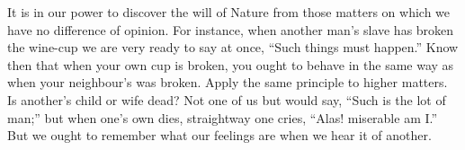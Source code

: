 It is in our  power to discover the will of Nature from  those matters on which
we have  no difference of opinion.  For instance, when another  man's slave has
broken  the wine-cup  we are  very ready  to say  at once,  ``Such things  must
happen.'' Know then  that when your own  cup is broken, you ought  to behave in
the same way as  when your neighbour's was broken. Apply  the same principle to
higher matters. Is another's  child or wife dead? Not one of  us but would say,
``Such is  the lot of  man;'' but when one's  own dies, straightway  one cries,
``Alas! miserable am I.''  But we ought to remember what  our feelings are when
we hear it of another.
